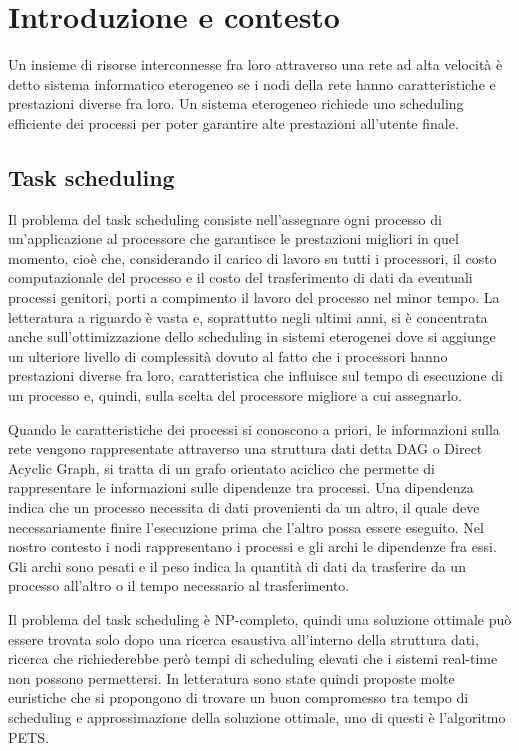 \chapter{Introduzione e contesto}\label{capitolo1intro}
\vspace{4cm}
Un insieme di risorse interconnesse fra loro attraverso una rete ad alta velocità è detto sistema informatico eterogeneo se i nodi della rete hanno caratteristiche e prestazioni diverse fra loro.
Un sistema eterogeneo richiede uno scheduling efficiente dei processi per poter garantire alte prestazioni all'utente finale.

\section{Task scheduling}
Il problema del task scheduling consiste nell'assegnare ogni processo di un'applicazione al processore che garantisce le prestazioni migliori in quel momento, cioè che, considerando il carico di lavoro su tutti i processori, il costo computazionale del processo e il costo del trasferimento di dati da eventuali processi genitori, porti a compimento il lavoro del processo nel minor tempo.
La letteratura a riguardo è vasta e, soprattutto negli ultimi anni, si è concentrata anche sull'ottimizzazione dello scheduling in sistemi eterogenei dove si aggiunge un ulteriore livello di complessità dovuto al fatto che i processori hanno prestazioni diverse fra loro, caratteristica che influisce sul tempo di esecuzione di un processo e, quindi, sulla scelta del processore migliore a cui assegnarlo.

Quando le caratteristiche dei processi si conoscono a priori, le informazioni sulla rete vengono rappresentate attraverso una struttura dati detta DAG o Direct Acyclic Graph, si tratta di un grafo orientato aciclico che permette di rappresentare le informazioni sulle dipendenze tra processi. Una dipendenza indica che un processo necessita di dati provenienti da un altro, il quale deve necessariamente finire l'esecuzione prima che l'altro possa essere eseguito.
Nel nostro contesto i nodi rappresentano i processi e gli archi le dipendenze fra essi. Gli archi sono pesati e il peso indica la quantità di dati da trasferire da un processo all'altro o il tempo necessario al trasferimento.

Il problema del task scheduling è NP-completo\cite{ULLMAN1975384}, quindi una soluzione ottimale può essere trovata solo dopo una ricerca esaustiva all'interno della struttura dati, ricerca che richiederebbe però tempi di scheduling elevati che i sistemi real-time non possono permettersi. 
In letteratura sono state quindi proposte molte euristiche che si propongono di trovare un buon compromesso tra tempo di scheduling e approssimazione della soluzione ottimale, uno di questi è l'algoritmo PETS\cite{ilavarasan2007low}.


